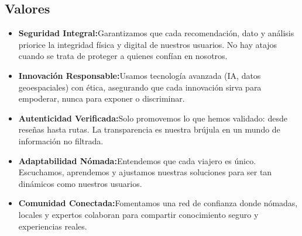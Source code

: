 \subsection{Valores}

\begin{itemize}
    \item \textbf{Seguridad Integral:}Garantizamos que cada recomendación, dato y análisis priorice la integridad física y digital de nuestros usuarios. No hay atajos cuando se trata de proteger a quienes confían en nosotros.
    \item \textbf{Innovación Responsable:}Usamos tecnología avanzada (IA, datos geoespaciales) con ética, asegurando que cada innovación sirva para empoderar, nunca para exponer o discriminar.
    \item \textbf{Autenticidad Verificada:}Solo promovemos lo que hemos validado: desde reseñas hasta rutas. La transparencia es nuestra brújula en un mundo de información no filtrada.
    \item \textbf{Adaptabilidad Nómada:}Entendemos que cada viajero es único. Escuchamos, aprendemos y ajustamos nuestras soluciones para ser tan dinámicos como nuestros usuarios.
    \item \textbf{Comunidad Conectada:}Fomentamos una red de confianza donde nómadas, locales y expertos colaboran para compartir conocimiento seguro y experiencias reales.
\end{itemize}
